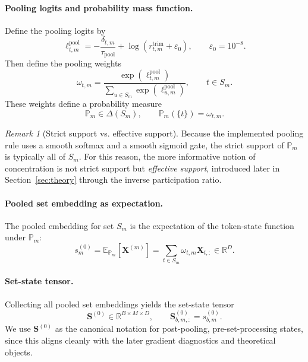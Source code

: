 \documentclass{article}
\theoremstyle{plain}
\theoremstyle{definition}
\theoremstyle{remark}
\newtheorem{remark}[theorem]{Remark}
\begin{document}
\paragraph{Pooling logits and probability mass function.}
Define the pooling logits by
\begin{equation}
\label{eq:pooling-logits}
\ell^{\mathrm{pool}}_{t,m}=-\frac{\delta_{t,m}}{\tau_{\mathrm{pool}}}+\log(r^{\mathrm{trim}}_{t,m}+\varepsilon_0),
\qquad
\varepsilon_0=10^{-8}.
\end{equation}
Then define the pooling weights
\begin{equation}
\label{eq:pooling-weights}
\omega_{t,m}=\frac{\exp(\ell^{\mathrm{pool}}_{t,m})}{\sum_{u\in S_m}\exp(\ell^{\mathrm{pool}}_{u,m})},
\qquad t\in S_m.
\end{equation}
These weights define a probability measure
\begin{equation}
\label{eq:pooling-pmf}
\mathbb P_m\in\Delta(S_m),
\qquad
\mathbb P_m(\{t\})=\omega_{t,m}.
\end{equation}

\begin{remark}[Strict support vs. effective support]
\label{rem:support-vs-effective-support}
Because the implemented pooling rule uses a smooth softmax and a smooth sigmoid gate, the strict support of $\mathbb P_m$ is typically all of $S_m$. For this reason, the more informative notion of concentration is not strict support but \emph{effective support}, introduced later in Section~\ref{sec:theory} through the inverse participation ratio.
\end{remark}

\paragraph{Pooled set embedding as expectation.}
The pooled embedding for set $S_m$ is the expectation of the token-state function under $\mathbb P_m$:
\begin{equation}
\label{eq:pooled-embedding}
s_m^{(0)}
=
\mathbb E_{\mathbb P_m}[\mathbf X^{(m)}]
=
\sum_{t\in S_m}\omega_{t,m}\mathbf X_{t,:}
\in\mathbb R^D.
\end{equation}

\paragraph{Set-state tensor.}
Collecting all pooled set embeddings yields the set-state tensor
\begin{equation}
\label{eq:set-states}
\mathbf S^{(0)}\in\mathbb R^{B\times M\times D},
\qquad
\mathbf S^{(0)}_{b,m,:}=s_{b,m}^{(0)}.
\end{equation}
We use $\mathbf S^{(0)}$ as the canonical notation for post-pooling, pre-set-processing states, since this aligns cleanly with the later gradient diagnostics and theoretical objects.
\end{document}
